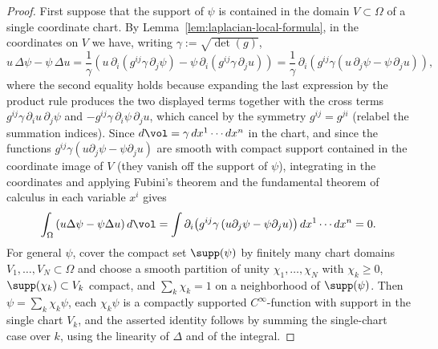 \begin{proof}
First suppose that the support of $\psi$ is contained in the domain
$V\subset\Omega$ of a single coordinate chart. By
Lemma~\ref{lem:laplacian-local-formula}, in the coordinates on $V$
we have, writing $\gamma:=\sqrt{\det(g)}$,
$$u\,\Delta\psi-\psi\,\Delta u
=\frac{1}{\gamma}\left(u\,\partial_i\!\left(g^{ij}\gamma\,
\partial_j\psi\right)-\psi\,\partial_i\!\left(g^{ij}\gamma\,
\partial_ju\right)\right)
=\frac{1}{\gamma}\,\partial_i\!\left(g^{ij}\gamma\left(u\,
\partial_j\psi-\psi\,\partial_ju\right)\right),$$
where the second equality holds because expanding the last
expression by the product rule produces the two displayed terms
together with the cross terms $g^{ij}\gamma\,\partial_iu\,
\partial_j\psi$ and $-g^{ij}\gamma\,\partial_i\psi\,\partial_ju$,
which cancel by the symmetry $g^{ij}=g^{ji}$ (relabel the summation
indices). Since $d\vol=\gamma\,dx^1\cdots dx^n$ in the chart, and
since the functions $g^{ij}\gamma\left(u\partial_j\psi-\psi
\partial_ju\right)$ are smooth with compact support contained in
the coordinate image of $V$ (they vanish off the support of
$\psi$), integrating in the coordinates and applying Fubini's
theorem and the fundamental theorem of calculus in each variable
$x^i$ gives
$$\int_\Omega\left(u\Delta\psi-\psi\Delta u\right)d\vol
=\int\partial_i\!\left(g^{ij}\gamma\left(u\partial_j\psi
-\psi\partial_ju\right)\right)dx^1\cdots dx^n=0.$$
For general $\psi$, cover the compact set $\supp(\psi)$ by
finitely many chart domains $V_1,\dots,V_N\subset\Omega$ and choose
a smooth partition of unity $\chi_1,\dots,\chi_N$ with
$\chi_k\ge0$, $\supp(\chi_k)\subset V_k$ compact, and
$\sum_k\chi_k=1$ on a neighborhood of $\supp(\psi)$. Then
$\psi=\sum_k\chi_k\psi$, each $\chi_k\psi$ is a compactly supported
$C^\infty$-function with support in the single chart $V_k$, and the
asserted identity follows by summing the single-chart case over
$k$, using the linearity of $\Delta$ and of the integral.
\end{proof}

